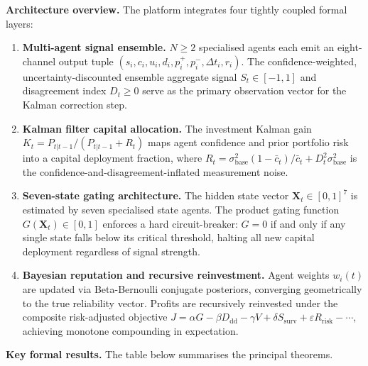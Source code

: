 \documentclass[12pt,openany]{book}
\numberwithin{equation}{chapter}
\theoremstyle{plain}
\theoremstyle{definition}
\theoremstyle{remark}
\begin{document}
\noindent
\textbf{Architecture overview.}\enspace
The platform integrates four tightly coupled formal layers:

\begin{enumerate}[label=\textbf{\arabic*.}, leftmargin=2em,
                  itemsep=3pt, parsep=0pt, topsep=4pt]
  \item \textbf{Multi-agent signal ensemble.}  $N \geq 2$
        specialised agents each emit an eight-channel output
        tuple $(s_i, c_i, u_i, d_i, p_i^+, p_i^-, \Delta t_i,
        r_i)$.  The confidence-weighted, uncertainty-discounted
        ensemble aggregate signal $S_t \in [-1,1]$ and
        disagreement index $D_t \geq 0$ serve as the primary
        observation vector for the Kalman correction step.
  \item \textbf{Kalman filter capital allocation.}  The
        investment Kalman gain $K_t = P_{t|t-1} /
        (P_{t|t-1} + R_t)$ maps agent confidence and prior
        portfolio risk into a capital deployment fraction, where
        $R_t = \sigma_{\mathrm{base}}^2 (1-\bar{c}_t)/\bar{c}_t
        + D_t^2 \sigma_{\mathrm{base}}^2$ is the
        confidence-and-disagreement-inflated measurement noise.
  \item \textbf{Seven-state gating architecture.}  The hidden
        state vector $\mathbf{X}_t \in [0,1]^7$ is estimated by
        seven specialised state agents.  The product gating
        function $G(\mathbf{X}_t) \in [0,1]$ enforces a hard
        circuit-breaker: $G = 0$ if and only if any single state
        falls below its critical threshold, halting all new
        capital deployment regardless of signal strength.
  \item \textbf{Bayesian reputation and recursive
        reinvestment.}  Agent weights $w_i(t)$ are updated via
        Beta-Bernoulli conjugate posteriors, converging
        geometrically to the true reliability vector.  Profits
        are recursively reinvested under the composite
        risk-adjusted objective $J = \alpha G - \beta D_{\mathrm{dd}}
        - \gamma V + \delta S_{\mathrm{surv}} + \varepsilon
        R_{\mathrm{risk}} - \cdots$, achieving monotone
        compounding in expectation.
\end{enumerate}

\noindent
\textbf{Key formal results.}\enspace
The table below summarises the principal theorems.
\end{document}

